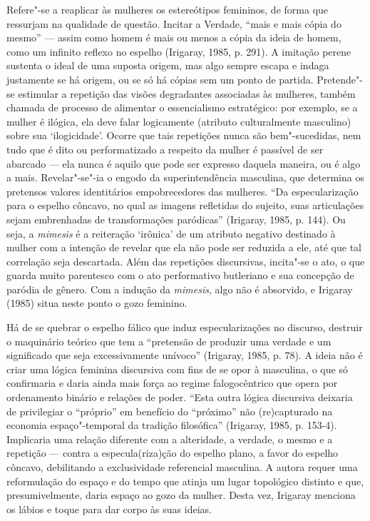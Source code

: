 Refere"-se a reaplicar às mulheres os estereótipos femininos, de forma
que ressurjam na qualidade de questão. Incitar a Verdade, ``mais e mais
cópia do mesmo'' --- assim como homem é mais ou menos a cópia da ideia
de homem, como um infinito reflexo no espelho (Irigaray, 1985, p.
291). A imitação perene sustenta o ideal de uma suposta origem, mas algo
sempre escapa e indaga justamente se há origem, ou se só há cópias sem
um ponto de partida. Pretende"-se estimular a repetição das visões
degradantes associadas às mulheres, também chamada de processo de
alimentar o essencialismo estratégico: por exemplo, se a mulher é
ilógica, ela deve falar logicamente (atributo culturalmente masculino)
sobre sua `ilogicidade'. Ocorre que tais repetições nunca são
bem"-sucedidas, nem tudo que é dito ou performatizado a respeito da
mulher é passível de ser abarcado --- ela nunca é aquilo que pode ser
expresso daquela maneira, ou é algo a mais. Revelar"-se"-ia o engodo da
superintendência masculina, que determina os pretensos valores
identitários empobrecedores das mulheres. ``Da especularização para o
espelho côncavo, no qual as imagens refletidas do sujeito, suas
articulações sejam embrenhadas de transformações paródicas'' (Irigaray,
1985, p. 144). Ou seja, a \emph{mimesis} é a reiteração `irônica'
de um atributo negativo destinado à mulher com a intenção de revelar que
ela não pode ser reduzida a ele, até que tal correlação seja descartada.
Além das repetições discursivas, incita"-se o ato, o que guarda muito
parentesco com o ato performativo butleriano e sua concepção de paródia
de gênero. Com a indução da \emph{mimesis}, algo não é absorvido, e
Irigaray (1985) situa neste ponto o gozo feminino.

Há de se quebrar o espelho fálico que induz especularizações no
discurso, destruir o maquinário teórico que tem a ``pretensão de
produzir uma verdade e um significado que seja excessivamente unívoco''
(Irigaray, 1985, p. 78). A ideia não é criar uma lógica feminina
discursiva com fins de se opor à masculina, o que só confirmaria e daria
ainda mais força ao regime falogocêntrico que opera por ordenamento
binário e relações de poder. ``Esta outra lógica discursiva deixaria de
privilegiar o ``próprio'' em benefício do ``próximo'' não (re)capturado
na economia espaço"-temporal da tradição filosófica'' (Irigaray,
1985, p. 153-4). Implicaria uma relação diferente com a
alteridade, a verdade, o mesmo e a repetição --- contra a
especula(riza)ção do espelho plano, a favor do espelho côncavo,
debilitando a exclusividade referencial masculina. A autora requer uma
reformulação do espaço e do tempo que atinja um lugar topológico
distinto e que, presumivelmente, daria espaço ao gozo da mulher. Desta
vez, Irigaray menciona os lábios e toque para dar corpo às suas ideias.

